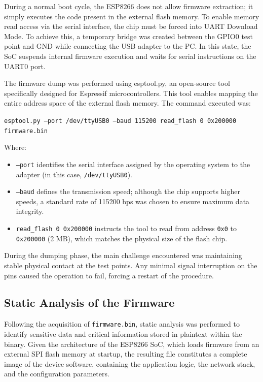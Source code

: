 \noindent During a normal boot cycle, the ESP8266 does not allow firmware extraction; it simply executes the code present in the external flash memory. To enable memory read access via the serial interface, the chip must be forced into UART Download Mode. To achieve this, a temporary bridge was created between the GPIO0 test point and GND while connecting the USB adapter to the PC. In this state, the SoC suspends internal firmware execution and waits for serial instructions on the UART0 port.

\noindent The firmware dump was performed using esptool.py, an open-source tool specifically designed for Espressif microcontrollers. This tool enables mapping the entire address space of the external flash memory. The command executed was:

\medskip
\noindent \texttt{esptool.py --port /dev/ttyUSB0 --baud 115200 read\_flash 0 0x200000 firmware.bin}

\medskip
\noindent Where:
\begin{itemize}
    \item \texttt{--port} identifies the serial interface assigned by the operating system to the adapter (in this case, \texttt{/dev/ttyUSB0}).
    
    \item \texttt{--baud} defines the transmission speed; although the chip supports higher speeds, a standard rate of 115200 bps was chosen to ensure maximum data integrity.
    
    \item \texttt{read\_flash 0 0x200000} instructs the tool to read from address \texttt{0x0} to \texttt{0x200000} (2 MB), which matches the physical size of the flash chip.
\end{itemize}

\noindent During the dumping phase, the main challenge encountered was maintaining stable physical contact at the test points. Any minimal signal interruption on the pins caused the operation to fail, forcing a restart of the procedure. 


\subsection{Static Analysis of the Firmware}
Following the acquisition of \texttt{firmware.bin}, static analysis was performed to identify sensitive data and critical information stored in plaintext within the binary. Given the architecture of the ESP8266 SoC, which loads firmware from an external SPI flash memory at startup, the resulting file constitutes a complete image of the device software, containing the application logic, the network stack, and the configuration parameters.

